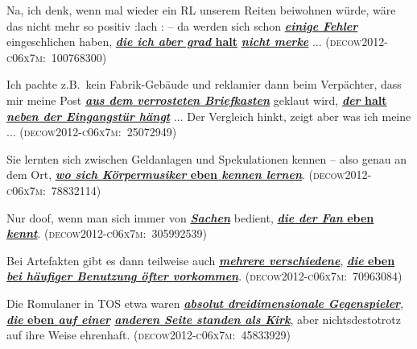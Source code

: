 \begin{exe}
	\ex\label{745} 
		\begin{xlist}	
		\ex\label{745a} 
	
		Na, ich denk, wenn mal wieder ein RL unserem Reiten beiwohnen würde, wäre das nicht mehr
	 	so positiv :lach : – da werden sich schon \ul{\textbf{\textit{einige Fehler}}} eingeschlichen haben, \ul{\textbf{\textit{die ich aber grad} halt}} \ul{\textbf{\textit{nicht merke}}} ...
	 	\hbox{}\hfill\hbox{\scshape(decow2012-c06x7m: 100768300)}
	 	\newline
	 	\hbox{}\hfill\hbox{\citet[168]{Mueller2016a}}
	 	\ex\label{745b} 
	 
	 	Ich pachte z.B.\ kein Fabrik-Gebäude und reklamier dann beim Verpächter, dass mir meine Post \ul{\textbf{\textit{aus dem verrosteten Briefkasten}}} geklaut wird, \ul{\textbf{\textit{der} halt \textit{neben der Eingangstür hängt}}} ... Der Vergleich hinkt, zeigt aber was ich meine ...                  
		\hfill\hbox{\scshape(decow2012-c06x7m: 25072949)}
		\end{xlist}
\end{exe}			
	
\begin{exe}
	\ex\label{746} 
		\begin{xlist}	
		\ex\label{746a} 
	
		Sie lernten sich zwischen Geldanlagen und Spekulationen kennen – also genau
	 	an dem Ort, \ul{\textbf{\textit{wo sich Körpermusiker} eben \textit{kennen lernen}}}. 
	 	\hfill\hbox{\scshape(decow2012-c06x7m: 78832114)}
	 	\newline
	 	\hbox{}\hfill\hbox{\citet[168]{Mueller2016a}}
	 	\ex\label{746b} 
	 
	 	Nur doof, wenn man sich immer von \ul{\textbf{\textit{Sachen}}} bedient, \ul{\textbf{\textit{die der Fan} eben \textit{kennt}}}.     
	 	\hbox{}\hfill\hbox{\scshape(decow2012-c06x7m: 305992539)}
		\end{xlist}
\end{exe}
 					                     
\begin{exe}
	\ex\label{747} 
		\begin{xlist}	
		\ex\label{747a} 
	
		Bei Artefakten gibt es dann teilweise auch \ul{\textit{\textbf{mehrere verschiedene}}}, \ul{\textbf{\textit{die} eben \textit{bei häufiger Benutzung öfter vorkommen}}}.
	 	\newline\hbox{}\hfill\hbox{\scshape(decow2012-c06x7m: 70963084)}
	 	\newline
	 	\hbox{}\hfill\hbox{\citet[168]{Mueller2016a}}
	 	\ex\label{747b} 
	 
	 	Die Romulaner in TOS etwa waren \ul{\textit{\textbf{absolut dreidimensionale Gegenspieler}}}, \textbf{\ul{\textit{die} eben \textit{auf einer}} \ul{\textit{anderen Seite standen als Kirk}}}, aber nichtsdestotrotz auf ihre Weise ehrenhaft. 	              
	 	\newline\hbox{}\hfill\hbox{\scshape(decow2012-c06x7m: 45833929)}
		\end{xlist}
\end{exe}

